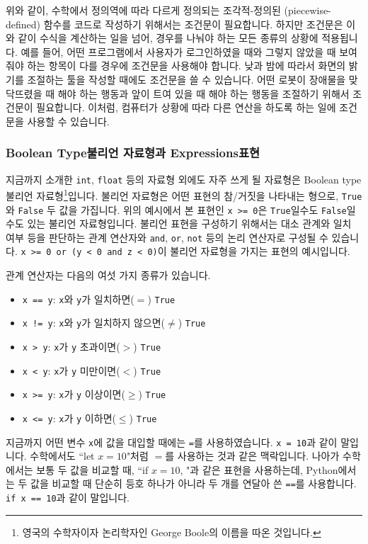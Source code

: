 \documentclass[../main.tex]{subfiles}
\begin{document}
위와 같이, 수학에서 정의역에 따라 다르게 정의되는 조각적-정의된
(piecewise-defined) 함수를 코드로 작성하기 위해서는 조건문이 필요합니다.
하지만 조건문은 이와 같이 수식을 계산하는 일을 넘어, 경우를 나눠야 하는 모든
종류의 상황에 적용됩니다.
예를 들어, 어떤 프로그램에서 사용자가 로그인하였을 때와 그렇지 않았을 때
보여줘야 하는 항목이 다를 경우에 조건문을 사용해야 합니다.
낮과 밤에 따라서 화면의 밝기를 조절하는 툴을 작성할 때에도 조건문을 쓸 수
있습니다.
어떤 로봇이 장애물을 맞닥뜨렸을 때 해야 하는 행동과 앞이 트여 있을 때 해야 하는
행동을 조절하기 위해서 조건문이 필요합니다.
이처럼, 컴퓨터가 상황에 따라 다른 연산을 하도록 하는 일에 조건문을 사용할 수
있습니다.

\subsubsection{Boolean Type불리언 자료형과 Expressions표현}
지금까지 소개한 \texttt{int}, \texttt{float} 등의 자료형 외에도 자주 쓰게 될
자료형은 Boolean type불리언 자료형\footnote{영국의 수학자이자 논리학자인 George
Boole의 이름을 따온 것입니다.}입니다.  불리언 자료형은 어떤 표현의 참/거짓을
나타내는 형으로, \texttt{True}와 \texttt{False} 두 값을 가집니다.  위의
예시에서 본 표현인 \texttt{x >= 0}은 \texttt{True}일수도 \texttt{False}일수도
있는 불리언 자료형입니다.  불리언 표현을 구성하기 위해서는 대소 관계와 일치
여부 등을 판단하는 관계 연산자와 \texttt{and}, \texttt{or}, \texttt{not} 등의
논리 연산자로 구성될 수 있습니다.  \texttt{x >= 0 or (y < 0 and z < 0)}이
불리언 자료형을 가지는 표현의 예시입니다.

관계 연산자는 다음의 여섯 가지 종류가 있습니다.
\begin{itemize}
  \item \texttt{x == y}: \texttt{x}와 \texttt{y}가 일치하면($=$) \texttt{True}
  \item \texttt{x != y}: \texttt{x}와 \texttt{y}가 일치하지 않으면($\neq$) \texttt{True}
  \item \texttt{x > y}: \texttt{x}가 \texttt{y} 초과이면($>$) \texttt{True}
  \item \texttt{x < y}: \texttt{x}가 \texttt{y} 미만이면($<$) \texttt{True}
  \item \texttt{x >= y}: \texttt{x}가 \texttt{y} 이상이면($\geq$) \texttt{True}
  \item \texttt{x <= y}: \texttt{x}가 \texttt{y} 이하면($\leq$) \texttt{True}
\end{itemize}
지금까지 어떤 변수 \texttt{x}에 값을 대입할 때에는 \texttt{=}를 사용하였습니다.
\texttt{x = 10}과 같이 말입니다.  수학에서도 ``let $x= 10$"처럼 $=$를 사용하는
것과 같은 맥락입니다.  나아가 수학에서는 보통 두 값을 비교할 때, ``if $x = 10$,
"과 같은 표현을 사용하는데, Python에서는 두 값을 비교할 때 단순히 등호 하나가
아니라 두 개를 연달아 쓴 \texttt{==}를 사용합니다.  \texttt{if x == 10}과 같이
말입니다.
\end{document}
